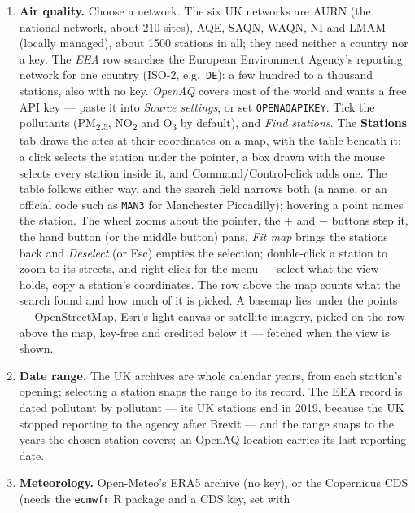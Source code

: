 \documentclass[11pt]{report}
\newcommand{\nosep}{\setlength{\itemsep}{0pt}\setlength{\parskip}{0pt}\setlength{\topsep}{2pt}}
\newcommand{\codeunderscore}{\textunderscore\allowbreak}
\newcommand{\code}[1]{\texttt{\let\_\codeunderscore #1}}
\newcommand{\tab}[1]{\textbf{#1}}
\newcommand{\NOtwo}{NO\textsubscript{2}}
\newcommand{\PMtwo}{PM\textsubscript{2.5}}
\begin{document}
\begin{enumerate}\nosep
  \item \textbf{Air quality.} Choose a network. The six UK networks are AURN (the
        national network, about 210 sites), AQE, SAQN, WAQN, NI and LMAM (locally
        managed), about 1500 stations in all; they need neither a country nor a key.
        The \emph{EEA} row searches the European Environment Agency's reporting
        network for one country (ISO-2, e.g.\ \code{DE}): a few hundred to a thousand
        stations, also with no key. \emph{OpenAQ} covers most of the world and wants
        a free API key --- paste it into \emph{Source settings}, or set
        \code{OPENAQ\_API\_KEY}. Tick the pollutants (\PMtwo{}, \NOtwo{} and
        O\textsubscript{3} by default), and \emph{Find stations}. The \tab{Stations}
        tab draws the sites at their coordinates on a map, with the table beneath
        it: a click selects the station under the pointer, a box drawn with the
        mouse selects every station inside it, and Command/Control-click adds
        one. The table follows either way, and the search field narrows both (a
        name, or an official code such as \code{MAN3} for Manchester
        Piccadilly); hovering a point names the station. The wheel zooms about
        the pointer, the $+$ and $-$ buttons step it, the hand button (or the
        middle button) pans, \emph{Fit map} brings the stations back and
        \emph{Deselect} (or Esc) empties the selection; double-click a station
        to zoom to its streets, and right-click for the menu --- select what the
        view holds, copy a station's coordinates. The row above the map counts
        what the search found and how much of it is picked. A basemap lies under the points
        --- OpenStreetMap, Esri's light canvas or satellite imagery, picked on
        the row above the map, key-free and credited below it --- fetched when
        the view is shown.
  \item \textbf{Date range.} The UK archives are whole calendar years, from each
        station's opening; selecting a station snaps the range to its record. The EEA
        record is dated pollutant by pollutant --- its UK stations end in 2019,
        because the UK stopped reporting to the agency after Brexit --- and the range
        snaps to the years the chosen station covers; an OpenAQ location carries its
        last reporting date.
  \item \textbf{Meteorology.} Open-Meteo's ERA5 archive (no key), or the Copernicus CDS
        (needs the \code{ecmwfr} R package and a CDS key, set with

\end{enumerate}
\end{document}
